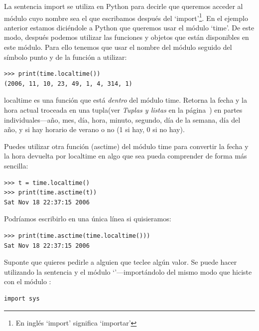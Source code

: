 La sentencia import se utiliza en Python para decirle que queremos acceder al módulo cuyo nombre sea el que escribamos después del `import'\footnote{En inglés `import' significa `importar'}.  En el ejemplo anterior estamos diciéndole a Python que queremos usar el módulo `time'. De este modo, después podemos utilizar las funciones y objetos que están disponibles en este módulo. Para ello tenemos que usar el nombre del módulo seguido del símbolo punto y de la función a utilizar:

\begin{listingignore}
\begin{verbatim}
>>> print(time.localtime())
(2006, 11, 10, 23, 49, 1, 4, 314, 1)
\end{verbatim}
\end{listingignore}

localtime es una función que está \emph{dentro} del módulo time. Retorna la fecha y la hora actual troceada en una tupla(ver \emph{Tuplas y listas} en la página~\pageref{tuplesandlists}) en partes individuales---año, mes, día, hora, minuto, segundo, día de la semana, día del año, y si hay horario de verano o no (1 si hay, 0 si no hay).

Puedes utilizar otra función (asctime) del módulo time para convertir la fecha y la hora devuelta por localtime en algo que sea pueda comprender de forma más sencilla:

\begin{listingignore}
\begin{verbatim}
>>> t = time.localtime()
>>> print(time.asctime(t))
Sat Nov 18 22:37:15 2006
\end{verbatim}
\end{listingignore}

\noindent
Podríamos escribirlo en una única línea si quisieramos:

\begin{listingignore}
\begin{verbatim}
>>> print(time.asctime(time.localtime()))
Sat Nov 18 22:37:15 2006
\end{verbatim}
\end{listingignore}

Suponte que quieres pedirle a alguien que teclee algún valor. Se puede hacer utilizando la sentencia  y el módulo `'---importándolo del mismo modo que hiciste con el módulo :

\begin{listing}
\begin{verbatim}
import sys
\end{verbatim}
\end{listing}

